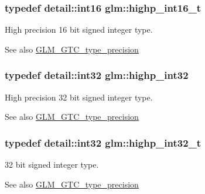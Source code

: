 \subsubsection[{highp\+\_\+int16\+\_\+t}]{\setlength{\rightskip}{0pt plus 5cm}typedef {\bf detail\+::int16} {\bf glm\+::highp\+\_\+int16\+\_\+t}}\label{group__gtc__type__precision_ga07d318d61472e75238e53b9642227672}
High precision 16 bit signed integer type. \begin{DoxySeeAlso}{See also}
\hyperlink{group__gtc__type__precision}{G\+L\+M\+\_\+\+G\+T\+C\+\_\+type\+\_\+precision} 
\end{DoxySeeAlso}
\hypertarget{group__gtc__type__precision_gaa2045c92b9553d463191af6a20e997bb}{}
\subsubsection[{highp\+\_\+int32}]{\setlength{\rightskip}{0pt plus 5cm}typedef {\bf detail\+::int32} {\bf glm\+::highp\+\_\+int32}}\label{group__gtc__type__precision_gaa2045c92b9553d463191af6a20e997bb}
High precision 32 bit signed integer type. \begin{DoxySeeAlso}{See also}
\hyperlink{group__gtc__type__precision}{G\+L\+M\+\_\+\+G\+T\+C\+\_\+type\+\_\+precision} 
\end{DoxySeeAlso}
\hypertarget{group__gtc__type__precision_ga783d077a513c1f475f6cdb406b4238c3}{}
\subsubsection[{highp\+\_\+int32\+\_\+t}]{\setlength{\rightskip}{0pt plus 5cm}typedef {\bf detail\+::int32} {\bf glm\+::highp\+\_\+int32\+\_\+t}}\label{group__gtc__type__precision_ga783d077a513c1f475f6cdb406b4238c3}
32 bit signed integer type. \begin{DoxySeeAlso}{See also}
\hyperlink{group__gtc__type__precision}{G\+L\+M\+\_\+\+G\+T\+C\+\_\+type\+\_\+precision} 
\end{DoxySeeAlso}
\hypertarget{group__gtc__type__precision_ga7ffb27943e9569800979081bc548621c}{}
